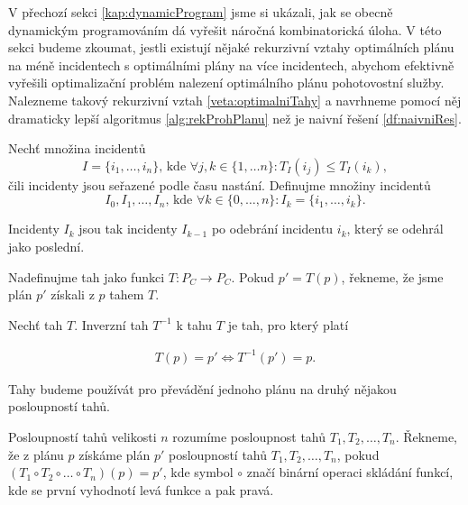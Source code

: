 V přechozí sekci \ref{kap:dynamicProgram} jsme si ukázali, jak se obecně dynamickým programováním dá 
vyřešit náročná kombinatorická úloha. V této sekci budeme zkoumat, jestli existují nějaké rekurzivní vztahy 
optimálních plánu na méně incidentech s optimálními plány na více incidentech, abychom efektivně vyřešili optimalizační problém nalezení optimálního plánu pohotovostní služby. 
Nalezneme takový rekurzivní vztah \ref{veta:optimalniTahy} a navrhneme pomocí něj dramaticky lepší algoritmus \ref{alg:rekProhPlanu}
než je naivní řešení \ref{df:naivniRes}.

\begin{definice}\label{df:INC}
  Nechť množina incidentů 
  \begin{equation*}
    I = \{ i_1, \dots , i_n \} \text{, kde } \forall j, k \in \{ 1, \dots n\} \colon T_I(i_j) \leq T_I(i_k),
  \end{equation*}
  čili incidenty jsou seřazené podle času nastání.
  Definujme množiny incidentů
  \begin{equation*}
    I_0, I_1, \dots, I_n \text{, kde } \forall k \in \{ 0, \dots, n \} \colon I_k = \{ i_1, \dots, i_k \}.
  \end{equation*}

  Incidenty $I_k$ jsou tak incidenty $I_{k-1}$ po odebrání incidentu $i_k$, který se odehrál jako poslední.
\end{definice}

\begin{definice}[Tah]\label{df:tah}
  Nadefinujme tah jako funkci $T \colon P_C \rightarrow P_C$.
  Pokud $p' = T(p)$, řekneme, že jsme plán $p'$ získali z $p$ tahem $T$.
\end{definice}

\begin{definice}\label{df:tah}
  Nechť tah $T$. Inverzní tah $T^{-1}$ k tahu $T$ je tah, pro který platí

  \begin{align*}
    T(p) = p' \Leftrightarrow T^{-1}(p') = p.
  \end{align*}
\end{definice}

Tahy budeme používát pro převádění jednoho plánu na druhý nějakou posloupností tahů.

\begin{definice}
  Posloupností tahů velikosti $n$ rozumíme posloupnost tahů $T_1, T_2, \dots, T_n$.
  Řekneme, že z plánu $p$ získáme plán $p'$ posloupností tahů $T_1, T_2, \dots, T_n$,
  pokud $(T_1 \circ T_2 \circ \dots \circ T_n)(p) = p'$, kde symbol $\circ$ značí binární operaci skládání funkcí,
  kde se první vyhodnotí levá funkce a pak pravá.
\end{definice}

